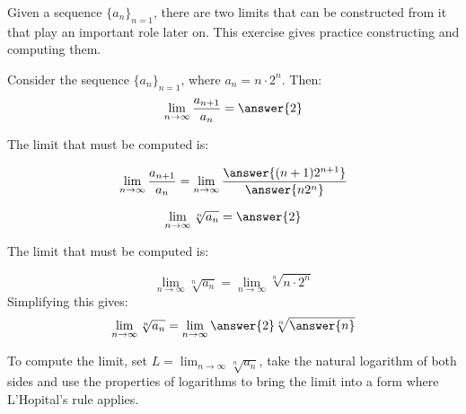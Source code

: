 \documentclass{ximera}
\author{Jim Talamo}
\begin{document}
\begin{exercise}

Given a sequence $\{a_n\}_{n=1}$, there are two limits that can be constructed from it that play an important role later on.  This exercise gives practice constructing and computing them.

Consider the sequence $\{a_n \}_{n=1}$, where $a_n =n \cdot 2^n$.  Then:
\[
\lim_{n \to \infty} \frac{a_{n+1}}{a_n} = \answer{2}
\]

\begin{hint}
The limit that must be computed is:

\[
\lim_{n \to \infty} \frac{a_{n+1}}{a_n} = \lim_{n \to \infty} \frac{\answer{(n+1) 2^{n+1}}}{\answer{n 2^n}}
\]

\end{hint}

\[
\lim_{n \to \infty} \sqrt[n]{a_n} = \answer{2}
\]
\begin{hint}
The limit that must be computed is:

\[
\lim_{n \to \infty} \sqrt[n]{a_n} = \lim_{n \to \infty} \sqrt[n]{n \cdot 2^n} 
\]
Simplifying this gives:
\[
\lim_{n \to \infty} \sqrt[n]{a_n} = \lim_{n \to \infty} \answer{2} \sqrt[n]{\answer{n}} 
\]

To compute the limit, set $L = \lim_{n \to \infty} \sqrt[n]{a_n}$, take the natural logarithm of both sides and use the properties of logarithms to bring the limit into a form where L'Hopital's rule applies.
\end{hint}
\end{exercise}
\end{document}
